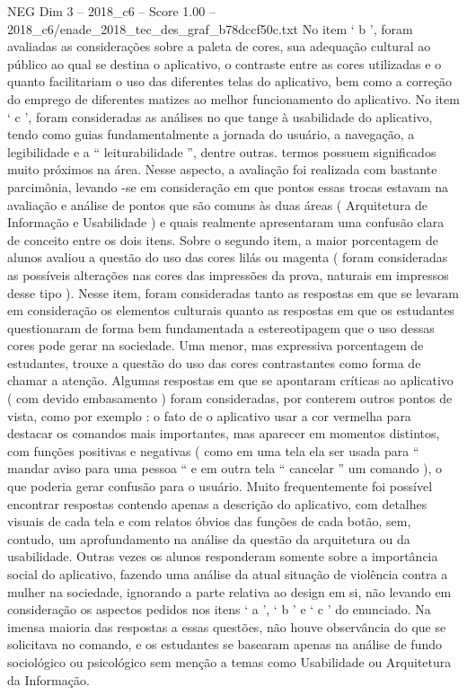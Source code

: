 \begin{textsample}{NEG Dim 3 – 2018\_c6 – Score 1.00 – 2018\_c6/enade\_2018\_tec\_des\_graf\_b78dccf50c.txt}
No item ‘ b ’, foram avaliadas as considerações sobre a paleta de cores, sua adequação cultural ao público ao qual se destina o aplicativo, o contraste entre as cores utilizadas e o quanto facilitariam o uso das diferentes telas do aplicativo, bem como a correção do emprego de diferentes matizes ao melhor funcionamento do aplicativo.
No item ‘ c ’, foram consideradas as análises no que tange à usabilidade do aplicativo, tendo como guias fundamentalmente a jornada do usuário, a navegação, a legibilidade e a “ leiturabilidade ”, dentre outras. termos possuem significados muito próximos na área.
Nesse aspecto, a avaliação foi realizada com bastante parcimônia, levando -se em consideração em que pontos essas trocas estavam na avaliação e análise de pontos que são comuns às duas áreas ( Arquitetura de Informação e Usabilidade ) e quais realmente apresentaram uma confusão clara de conceito entre os dois itens.
Sobre o segundo item, a maior porcentagem de alunos avaliou a questão do uso das cores lilás ou magenta ( foram consideradas as possíveis alterações nas cores das impressões da prova, naturais em impressos desse tipo ).
Nesse item, foram consideradas tanto as respostas em que se levaram em consideração os elementos culturais quanto as respostas em que os estudantes questionaram de forma bem fundamentada a estereotipagem que o uso dessas cores pode gerar na sociedade.
Uma menor, mas expressiva porcentagem de estudantes, trouxe a questão do uso das cores contrastantes como forma de chamar a atenção.
Algumas respostas em que se apontaram críticas ao aplicativo ( com devido embasamento ) foram consideradas, por conterem outros pontos de vista, como por exemplo : o fato de o aplicativo usar a cor vermelha para destacar os comandos mais importantes, mas aparecer em momentos distintos, com funções positivas e negativas ( como em uma tela ela ser usada para “ mandar aviso para uma pessoa “ e em outra tela “ cancelar ” um comando ), o que poderia gerar confusão para o usuário.
Muito frequentemente foi possível encontrar respostas contendo apenas a descrição do aplicativo, com detalhes visuais de cada tela e com relatos óbvios das funções de cada botão, sem, contudo, um aprofundamento na análise da questão da arquitetura ou da usabilidade.
Outras vezes os alunos responderam somente sobre a importância social do aplicativo, fazendo uma análise da atual situação de violência contra a mulher na sociedade, ignorando a parte relativa ao design em si, não levando em consideração os aspectos pedidos nos itens ‘ a ’, ‘ b ’ e ‘ c ’ do enunciado.
Na imensa maioria das respostas a essas questões, não houve observância do que se solicitava no comando, e os estudantes se basearam apenas na análise de fundo sociológico ou psicológico sem menção a temas como Usabilidade ou Arquitetura da Informação.

\end{textsample}
